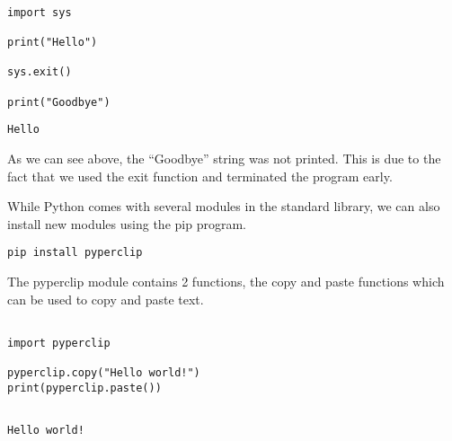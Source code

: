 \documentclass[11pt]{article}
\begin{document}
\begin{verbatim}

import sys

print("Hello")

sys.exit()

print("Goodbye")

\end{verbatim}

\begin{verbatim}
Hello
\end{verbatim}


As we can see above, the ``Goodbye'' string was not printed. This is due to the fact that we used the exit function and terminated the program early.


While Python comes with several modules in the standard library, we can also install new modules using the pip program.

\begin{verbatim}
pip install pyperclip
\end{verbatim}


The pyperclip module contains 2 functions, the copy and paste functions which can be used to copy and paste text.

\begin{verbatim}

import pyperclip

pyperclip.copy("Hello world!")
print(pyperclip.paste())


\end{verbatim}

\begin{verbatim}
Hello world!
\end{verbatim}
\end{document}
